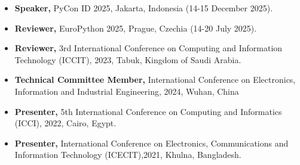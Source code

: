 

\begin{itemize}

\item {{\fontsize{9.5pt}{1em}\bodyfont\color{text}\textbf{Speaker,}}} {{\fontsize{8.5pt}{1em}\bodyfont\color{text}PyCon ID 2025, Jakarta, Indonesia (14-15 December 2025).}}
\vspace{-.6em}


\item {{\fontsize{9.5pt}{1em}\bodyfont\color{text}\textbf{Reviewer,}}} {{\fontsize{8.5pt}{1em}\bodyfont\color{text}EuroPython 2025, Prague, Czechia (14-20 July 2025).}}
\vspace{-.6em}


\item {{\fontsize{9.5pt}{1em}\bodyfont\color{text}\textbf{Reviewer,}}} {{\fontsize{8.5pt}{1em}\bodyfont\color{text}3rd International Conference on Computing and Information Technology (ICCIT), 2023, Tabuk, Kingdom of Saudi Arabia.}}
\vspace{-.6em}


\item {{\fontsize{9.5pt}{1em}\bodyfont\color{text}\textbf{Technical Committee Member,}}} {{\fontsize{8.5pt}{1em}\bodyfont\color{text}International Conference on Electronics, Information and Industrial Engineering, 2024, Wuhan, China}}
\vspace{-.6em}

\item {{\fontsize{9.5pt}{1em}\bodyfont\color{text}\textbf{Presenter,}}} {{\fontsize{8.5pt}{1em}\bodyfont\color{text}5th International Conference on Computing and Informatics (ICCI), 2022, Cairo, Egypt.}}
\vspace{-.6em}

\item {{\fontsize{9.5pt}{1em}\bodyfont\color{text}\textbf{Presenter,}}} {{\fontsize{8.5pt}{1em}\bodyfont\color{text}International Conference on Electronics, Communications and Information Technology (ICECIT),2021, Khulna, Bangladesh.}}

\end{itemize}


